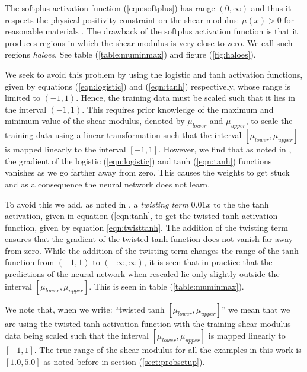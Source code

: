 \documentclass[10pt]{article}
\begin{document}
The softplus activation function (\ref{eqn:softplus}) has range $(0,\infty)$ and thus it respects the physical positivity constraint on the shear modulus: $\mu(x)>0$ for reasonable materials \cite{book:segelmathcont}. The drawback of the softplus activation function is that it produces regions in which the shear modulus is very close to zero. We call such regions \textit{haloes}. See table (\ref{table:muminmax}) and figure (\ref{fig:haloes}).

We seek to avoid this problem by using the logistic and tanh activation functions, given by equations (\ref{eqn:logistic}) and (\ref{eqn:tanh}) respectively, whose range is limited to $(-1,1)$. Hence, the training data must be scaled such that it lies in the interval $(-1,1)$. This requires prior knowledge of the maximum and minimum value of the shear modulus, denoted by $\mu_{lower}$ and $\mu_{upper}$, to scale the training data using a linear transformation such that the interval $[\mu_{lower},\mu_{upper}]$ is mapped linearly to the interval $[-1,1]$. However, we find that as noted in \cite{bookchap:lecun98b}, the gradient of the logistic (\ref{eqn:logistic}) and tanh (\ref{eqn:tanh}) functions vanishes as we go farther away from zero. This causes the weights to get stuck and as a consequence the neural network does not learn.

To avoid this we add, as noted in \cite{bookchap:lecun98b}, a \textit{twisting term} $0.01x$ to the the tanh activation, given in equation (\ref{eqn:tanh}, to get the twisted tanh activation function, given by equation \ref{eqn:twisttanh}. The addition of the twisting term ensures that the gradient of the twisted tanh function does not vanish far away from zero. While the addition of the twisting term changes the range of the tanh function from $(-1,1)$ to $(-\infty,\infty)$, it is seen that in practice that the predictions of the neural network when rescaled lie only slightly outside the interval $[\mu_{lower},\mu_{upper}]$. This is seen in table (\ref{table:muminmax}).

We note that, when we write: ``twisted tanh $[\mu_{lower},\mu_{upper}]$'' we mean that we are using the twisted tanh activation function with the training shear modulus data being scaled such that the interval $[\mu_{lower},\mu_{upper}]$ is mapped linearly to $[-1,1]$. The true range of the shear modulus for all the examples in this work is $[1.0,5.0]$ as noted before in section (\ref{sect:probsetup}).
\end{document}
